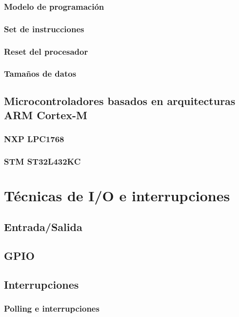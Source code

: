 \documentclass[a4paper]{book}
\begin{document}
\subsection{Modelo de programación}

\subsection{Set de instrucciones}

\subsection{Reset del procesador}

\subsection{Tamaños de datos}

\section{Microcontroladores basados en arquitecturas ARM Cortex-M}

\subsection{NXP LPC1768}

\subsection{STM ST32L432KC}

\chapter{Técnicas de I/O e interrupciones}

\section{Entrada/Salida}

\section{GPIO}

\section{Interrupciones}

\subsection{Polling e interrupciones}
\end{document}
